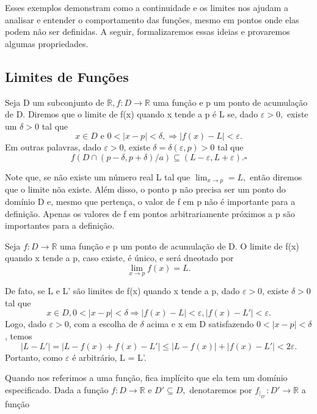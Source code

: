 \documentclass[Analysis/analysis_notes.tex]{subfiles}
\begin{document}
Esses exemplos demonstram como a continuidade e os limites nos ajudam a analisar e entender o comportamento das funções, mesmo em pontos onde elas podem não ser definidas.
A seguir, formalizaremos essas ideias e provaremos algumas propriedades.

\subsection{Limites de Fun\c c\~oes}
\begin{def*}
	Seja D um subconjunto de $\mathbb{R}, f:D\rightarrow \mathbb{R}$ uma fun\c c\~ao e p um ponto de acumula\c c\~ao de D. Diremos que
	o limite de f(x) quando x tende a p \'e L se, dado $\varepsilon > 0,$ existe um $\delta > 0$ tal que
	$$
		x\in D\text{ e } 0 < |x-p| < \delta, \Rightarrow |f(x) - L | < \varepsilon.
	$$
	Em outras palavras, dado $\varepsilon > 0$, existe $\delta = \delta(\varepsilon, p) > 0$ tal que
	$$
		f(D\cap(p-\delta, p+\delta)/a)\subseteq{(L-\varepsilon, L+\varepsilon).} \square
	$$
\end{def*}
Note que, se n\~ao existe um n\'umero real L tal que $\lim_{x\to p}= L,$ ent\~ao diremos que o limite n\~oa existe. Al\'em disso,
o ponto p n\~ao precisa ser um ponto do dom\'inio D e, mesmo que perten\c ca, o valor de f em p n\~ao \'e importante para a defini\c c\~ao.
Apenas os valores de f em pontos arbitrariamente pr\'oximos a p s\~ao importantes para a defini\c c\~ao.
\begin{theorem*}
	Seja $f:D\rightarrow \mathbb{R}$ uma fun\c c\~ao e p um ponto de acumula\c c\~ao de D. O limite de f(x) quando x tende a p,
	caso existe, \'e \'unico, e ser\'a dneotado por
	$$
		\lim_{x\to p}f(x) = L.
	$$
\end{theorem*}
\begin{proof*}
	De fato, se L e L' s\~ao limites de f(x) quando x tende a p, dado $\varepsilon > 0$, existe $\delta > 0$ tal que
	$$
		x\in D, 0 < |x-p| < \delta \Rightarrow |f(x)- L| < \varepsilon, |f(x) - L'|< \varepsilon.
	$$
	Logo, dado $\varepsilon > 0$, com a escolha de $\delta$ acima e x em D satisfazendo $0 <|x-p|<\delta$, temos
	$$
		|L - L'| = |L -f(x) + f(x) - L'| \leq{} |L - f(x)| + |f(x) - L'| < 2\varepsilon.
	$$
	Portanto, como $\varepsilon$ \'e arbitr\'ario, L = L'. \qedsymbol
\end{proof*}
Quando nos referimos a uma fun\c c\~ao, fica impl\'icito que ela tem um dom\'inio especificado. Dada a fun\c c\~ao
$f:D\rightarrow \mathbb{R}$ e $D'\subseteq{D},$ denotaremos por $f_{|_{D'}}:D'\rightarrow \mathbb{R}$ a fun\c c\~ao
\end{document}
